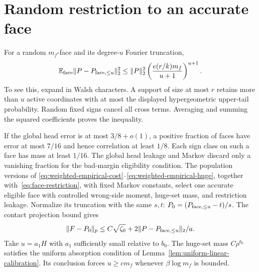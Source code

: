 \section{Random restriction to an accurate face}\label{sec:face-restriction}
For a random $m_f$-face and its degree-$u$ Fourier truncation,
\begin{equation}\label{eq:face-restriction}
 \mathbb E_{\rm face}\|P-P_{\rm face,\le u}\|_2^2
 \le\|P\|_2^2
       \left(\frac{e(r/k)m_f}{u+1}\right)^{u+1}.
\end{equation}
To see this, expand in Walsh characters. A support of size at most $r$
retains more than $u$ active coordinates with at most the displayed
hypergeometric upper-tail probability. Random fixed signs cancel all
cross terms. Averaging and summing the squared coefficients proves the
inequality.

If the global head error is at most $3/8+o(1)$, a positive fraction of
faces have error at most $7/16$ and hence correlation at least $1/8$.
Each sign class on such a face has mass at least $1/16$.
The global head leakage and Markov discard only a vanishing fraction
for the bad-margin eligibility condition. The population versions of
\eqref{eq:weighted-empirical-cost}--\eqref{eq:weighted-empirical-huge},
together with~\eqref{eq:face-restriction}, with fixed
Markov constants, select one accurate eligible face with controlled
wrong-side moment, huge-set mass, and restriction leakage.
Normalize its truncation with the same $s,t$:
$P_0=(P_{\rm face,\le u}-t)/s$. The contact projection bound gives
\[
 \|F-P_0\|_p\le C\sqrt{\zeta_0}
                +2\|P-P_{\rm face,\le u}\|_2/a.
\]
Take $u=a_1H$ with $a_1$ sufficiently small relative to $b_0$.
The huge-set mass $C\rho^{b_0}$ satisfies the uniform absorption
condition of Lemma~\ref{lem:uniform-linear-calibration}. Its conclusion
forces $u\ge c m_f$ whenever $\beta\log m_f$ is bounded.
